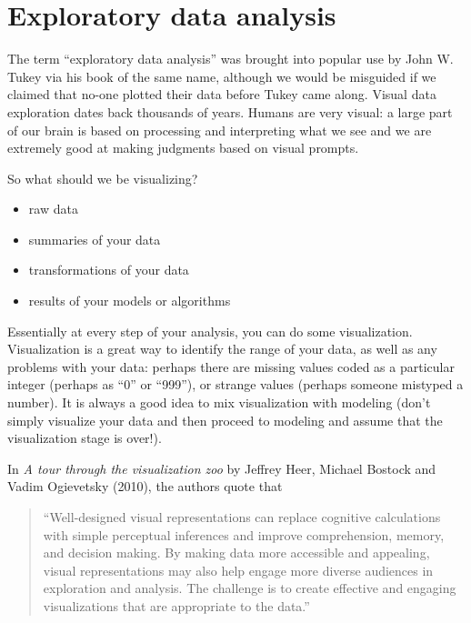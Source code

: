 

\chapter{Exploratory data analysis}
\label{ch:eda}



The term ``exploratory data analysis'' was brought into popular use by John W. Tukey via his book of the same name, although we would be misguided if we claimed that no-one plotted their data before Tukey came along. Visual data exploration dates back thousands of years. Humans are very visual: a large part of our brain is based on processing and interpreting what we see and we are extremely good at making judgments based on visual prompts. 

So what should we be visualizing?

\begin{itemize}
\item raw data
\item summaries of your data
\item transformations of your data
\item results of your models or algorithms
\end{itemize}

Essentially at every step of your analysis, you can do some visualization. Visualization is a great way to identify the range of your data, as well as any problems with your data: perhaps there are missing values coded as a particular integer (perhaps as ``0'' or ``999''), or strange values (perhaps someone mistyped a number). It is always a good idea to mix visualization with modeling (don't simply visualize your data and then proceed to modeling and assume that the visualization stage is over!). 

In \emph{A tour through the visualization zoo} by Jeffrey Heer, Michael Bostock and Vadim Ogievetsky (2010), the authors quote that
\begin{quote}
``Well-designed visual representations can replace cognitive calculations with simple perceptual inferences and improve comprehension, memory, and decision making. By making data more accessible and appealing, visual representations may also help engage more diverse audiences in exploration and analysis. The challenge is to create effective and engaging visualizations that are appropriate to the data.''
\end{quote}



